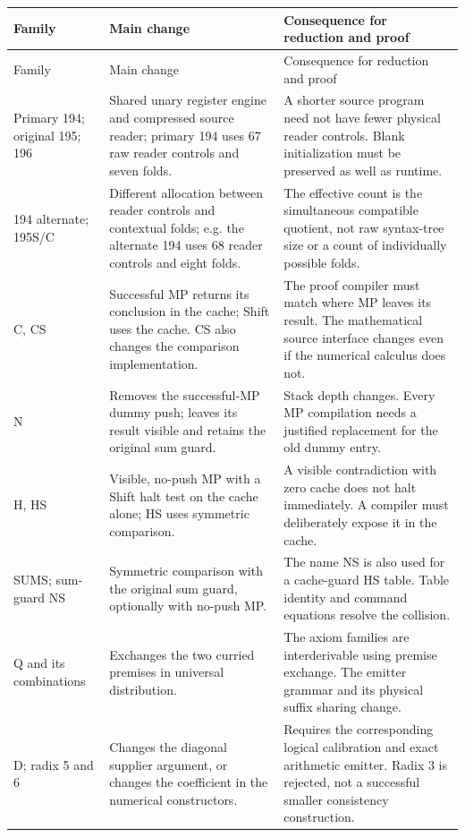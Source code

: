 \documentclass[11pt,a4paper]{article}
\begin{document}
\begin{longtable}{@{}p{}p{}p{}@{}}
\toprule
Family & Main change & Consequence for reduction and proof\\
\midrule\endfirsthead
\toprule Family & Main change & Consequence for reduction and proof\\
\midrule\endhead
Primary 194; original 195; 196 & Shared unary register engine and compressed source reader; primary 194 uses 67 raw reader controls and seven folds. & A shorter source program need not have fewer physical reader controls. Blank initialization must be preserved as well as runtime.\\
194 alternate; 195S/C & Different allocation between reader controls and contextual folds; e.g. the alternate 194 uses 68 reader controls and eight folds. & The effective count is the simultaneous compatible quotient, not raw syntax-tree size or a count of individually possible folds.\\
C, CS & Successful MP returns its conclusion in the cache; Shift uses the cache. CS also changes the comparison implementation. & The proof compiler must match where MP leaves its result. The mathematical source interface changes even if the numerical calculus does not.\\
N & Removes the successful-MP dummy push; leaves its result visible and retains the original sum guard. & Stack depth changes. Every MP compilation needs a justified replacement for the old dummy entry.\\
H, HS & Visible, no-push MP with a Shift halt test on the cache alone; HS uses symmetric comparison. & A visible contradiction with zero cache does not halt immediately. A compiler must deliberately expose it in the cache.\\
SUMS; sum-guard NS & Symmetric comparison with the original sum guard, optionally with no-push MP. & The name NS is also used for a cache-guard HS table. Table identity and command equations resolve the collision.\\
Q and its combinations & Exchanges the two curried premises in universal distribution. & The axiom families are interderivable using premise exchange. The emitter grammar and its physical suffix sharing change.\\
D; radix 5 and 6 & Changes the diagonal supplier argument, or changes the coefficient in the numerical constructors. & Requires the corresponding logical calibration and exact arithmetic emitter. Radix 3 is rejected, not a successful smaller consistency construction.\\

\end{longtable}
\end{document}
